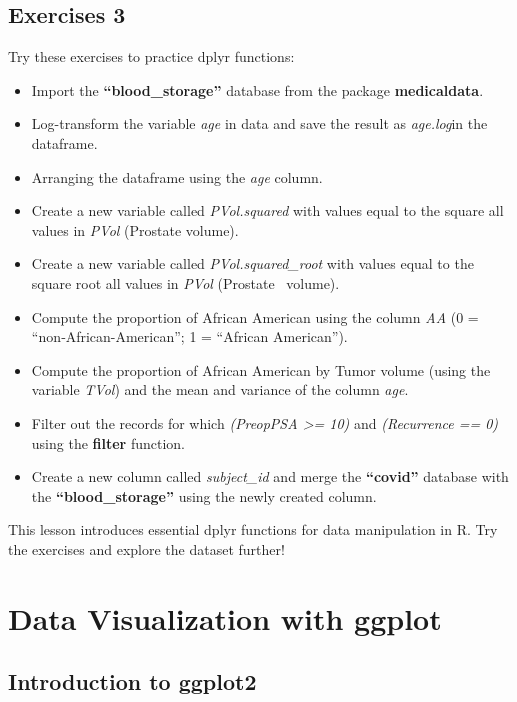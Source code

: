 \documentclass[
]{book}
\begin{document}
\section{Exercises 3}\label{exercises-3}

Try these exercises to practice dplyr functions:

\begin{itemize}
\item
  Import the \textbf{``blood\_storage''} database from the package \textbf{medicaldata}.
\item
  Log-transform the variable \emph{age} in data and save the result as \emph{age.log}in the dataframe.
\item
  Arranging the dataframe using the \emph{age} column.
\item
  Create a new variable called \emph{PVol.squared} with values equal to the square all values in \emph{PVol} (Prostate volume).
  ~
\item
  Create a new variable called \emph{PVol.squared\_root} with values equal to the square root all values in \emph{PVol} (Prostate
  ~volume).
  ~
\item
  Compute the proportion of African American using the column \emph{AA} (0 = ``non‐African-American''; 1 = ``African American'').
\item
  Compute the proportion of African American by Tumor volume (using the variable \emph{TVol}) and the mean and variance of the column \emph{age}.
\item
  Filter out the records for which \emph{(PreopPSA \textgreater= 10)} and \emph{(Recurrence == 0)} using the \textbf{filter} function.
\item
  Create a new column called \emph{subject\_id} and merge the \textbf{``covid''} database with the \textbf{``blood\_storage''} using the newly created column.
\end{itemize}

This lesson introduces essential dplyr functions for data manipulation in R. Try the exercises and explore the dataset further! 🚀

\chapter{Data Visualization with ggplot}\label{data-visualization-with-ggplot}

\section{Introduction to ggplot2}\label{introduction-to-ggplot2}
\end{document}
